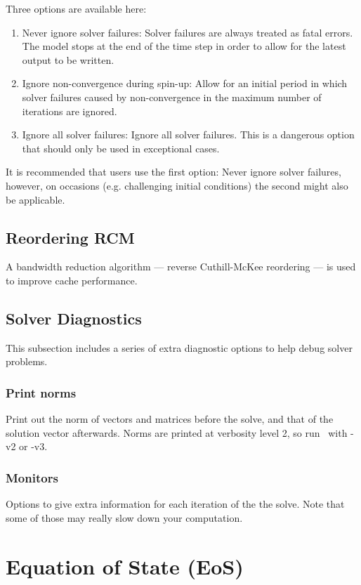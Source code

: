 Three options are available here:

\begin{enumerate}
\item Never ignore solver failures: Solver failures are always treated as fatal errors. The model stops at the end of the time step in order to allow for the latest output to be written.
\item Ignore non-convergence during spin-up: Allow for an initial period in which solver failures caused by non-convergence in the maximum number of iterations are ignored.
\item Ignore all solver failures: Ignore all solver failures. This is a dangerous option that should only be used in exceptional cases.
\end{enumerate}

It is recommended that users use the first option: Never ignore solver failures, however, on occasions (e.g. challenging initial conditions) the second might also be applicable.

\subsection{Reordering RCM}

A bandwidth reduction algorithm --- reverse Cuthill-McKee reordering --- is used to improve cache performance.

\subsection{Solver Diagnostics}

This subsection includes a series of extra diagnostic options to help debug solver problems.

\subsubsection{Print norms}
Print out the norm of vectors and matrices before the solve, and that of the solution vector afterwards. Norms are printed at verbosity level 2, so run \fluidity\ with -v2 or -v3.

\subsubsection{Monitors}
Options to give extra information for each iteration of the the solve. Note that some of those may really slow down your computation.


\section{Equation of State (EoS)}\label{sec:ConfigEOS}

